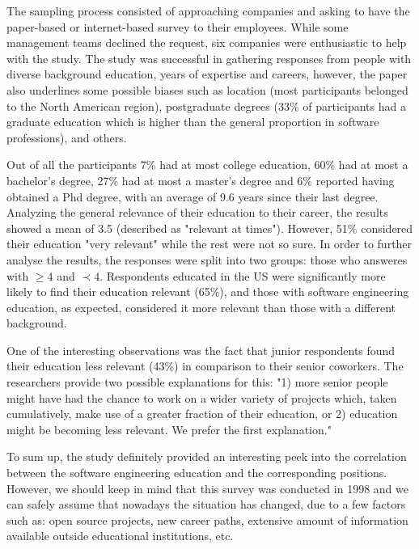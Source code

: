 \documentclass{report}
\begin{document}
The sampling process consisted of approaching companies and asking to have the paper-based or internet-based survey to their employees. While some management teams declined the request, six companies were enthusiastic to help with the study. The study was successful in gathering responses from people with diverse background education, years of expertise and careers, however, the paper also underlines some possible biases such as location (most participants belonged to the North American region), postgraduate degrees (33\% of participants had a graduate education which is higher than the general proportion in software professions), and others.

Out of all the participants 7\% had at most college education, 60\% had at most a bachelor's degree, 27\% had at most a master's degree and 6\% reported having obtained a Phd degree, with an average of 9.6 years since their last degree. Analyzing the general relevance of their education to their career, the results showed a mean of 3.5 (described as "relevant at times"). However, 51\% considered their education "very relevant" while the rest were not so sure. In order to further analyse the results, the responses were split into two groups: those who answeres with $\geq4$ and $\prec4$.  Respondents educated in the US were significantly more likely to find their education
relevant (65\%), and those with software engineering education, as expected, considered it more relevant than those with a different background. 

One of the interesting observations was the fact that junior respondents found their education less relevant (43\%) in comparison to their senior coworkers. The researchers provide two possible explanations for this: "1) more senior people might have had the chance to work on a wider variety of projects which, taken cumulatively, make use of a greater fraction of their education, or 2) education might be becoming less relevant. We prefer the first explanation." \cite{lethbridge}

To sum up, the study definitely provided an interesting peek into the correlation between the software engineering education and the corresponding positions. However, we should keep in mind that this survey was conducted in 1998 and we can safely assume that nowadays the situation has changed, due to a few factors such as: open source projects, new career paths, extensive amount of information available outside educational institutions, etc.


{}

\end{document}
